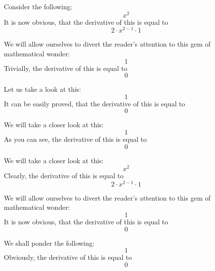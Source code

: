 \documentclass{article}
\begin{document}
Consider the following:
\begin{equation}
x ^{2 } 
\end{equation}
It is now obvious, that the derivative of this is equal to
\begin{equation}
2 \cdot x ^{2 - 1 } \cdot 1 
\end{equation}

We will allow ourselves to divert the reader's attention to this gem of mathematical wonder:
\begin{equation}
1 
\end{equation}
Trivially, the derivative of this is equal to
\begin{equation}
0 
\end{equation}

Let us take a look at this:
\begin{equation}
1 
\end{equation}
It can be easily proved, that the derivative of this is equal to
\begin{equation}
0 
\end{equation}

We will take a closer look at this:
\begin{equation}
1 
\end{equation}
As you can see, the derivative of this is equal to
\begin{equation}
0 
\end{equation}

We will take a closer look at this:
\begin{equation}
x ^{2 } 
\end{equation}
Clearly, the derivative of this is equal to
\begin{equation}
2 \cdot x ^{2 - 1 } \cdot 1 
\end{equation}

We will allow ourselves to divert the reader's attention to this gem of mathematical wonder:
\begin{equation}
1 
\end{equation}
It is now obvious, that the derivative of this is equal to
\begin{equation}
0 
\end{equation}

We shall ponder the following:
\begin{equation}
1 
\end{equation}
Obviously, the derivative of this is equal to
\begin{equation}
0 
\end{equation}
\end{document}

